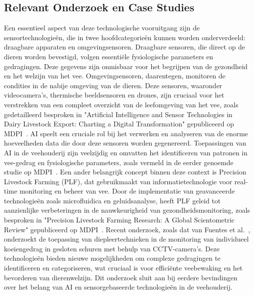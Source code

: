 \subsection{Relevant Onderzoek en Case Studies}
\newline
Een essentieel aspect van deze technologische vooruitgang zijn de sensortechnologieën, die in twee hoofdcategorieën kunnen worden onderverdeeld: draagbare apparaten en omgevingsensoren. 
Draagbare sensoren, die direct op de dieren worden bevestigd, volgen essentiële fysiologische parameters en gedragingen. 
Deze gegevens zijn onmisbaar voor het begrijpen van de gezondheid en het welzijn van het vee. Omgevingsensoren, daarentegen, monitoren de condities in de nabije omgeving van de dieren. 
Deze sensoren, waaronder videocamera's, thermische beeldsensoren en drones, zijn cruciaal voor het verstrekken van een compleet overzicht van de leefomgeving van het vee, zoals gedetailleerd besproken in "Artificial Intelligence and Sensor Technologies in Dairy Livestock Export: Charting a Digital Transformation" gepubliceerd op MDPI~\autocite{MDPIAIandSensors}.
\newline
AI speelt een cruciale rol bij het verwerken en analyseren van de enorme hoeveelheden data die door deze sensoren worden gegenereerd. 
Toepassingen van AI in de veehouderij zijn veelzijdig en omvatten het identificeren van patronen in vee-gedrag en fysiologische parameters, zoals vermeld in de eerder genoemde studie op MDPI~\autocite{MDPIAIandSensors}.
\newline
Een ander belangrijk concept binnen deze context is Precision Livestock Farming (PLF), dat gebruikmaakt van informatietechnologie voor real-time monitoring en beheer van vee. 
Door de implementatie van geavanceerde technologieën zoals microfluidica en geluidsanalyse, heeft PLF geleid tot aanzienlijke verbeteringen in de nauwkeurigheid van gezondheidsmonitoring, zoals besproken in "Precision Livestock Farming Research: A Global Scientometric Review" gepubliceerd op MDPI~\autocite{MDPIPLF}.
\newline
Recent onderzoek, zoals dat van Fuentes et al.~\autocite{Fuentes2023}, onderzoekt de toepassing van diepleertechnieken in de monitoring van individueel koeiengedrag in gesloten schuren met behulp van CCTV-camera's. 
Deze technologieën bieden nieuwe mogelijkheden om complexe gedragingen te identificeren en categoriseren, wat cruciaal is voor efficiënte veebewaking en het bevorderen van dierenwelzijn. 
Dit onderzoek sluit aan bij eerdere bevindingen over het belang van AI en sensorgebaseerde technologieën in de veehouderij.
